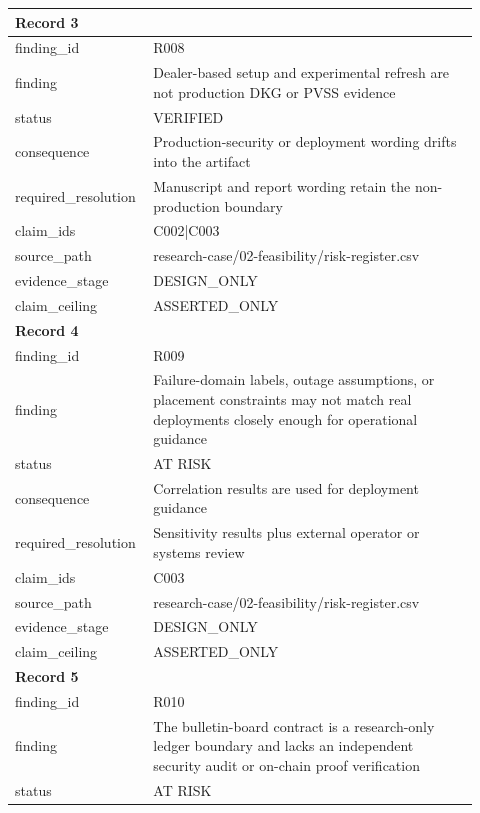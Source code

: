 \begin{longtable}{|p{0.24\linewidth}|p{0.68\linewidth}|}
\multicolumn{2}{|l|}{\textbf{Record 3}} \\ \hline
finding\_\allowbreak{}id & R008 \\ \hline
finding & Dealer-based setup and experimental refresh are not production DKG or PVSS evidence \\ \hline
status & VERIFIED \\ \hline
consequence & Production-security or deployment wording drifts into the artifact \\ \hline
required\_\allowbreak{}resolution & Manuscript and report wording retain the non-production boundary \\ \hline
claim\_\allowbreak{}ids & C002|C003 \\ \hline
source\_\allowbreak{}path & research-case/02-feasibility/risk-register.csv \\ \hline
evidence\_\allowbreak{}stage & DESIGN\_\allowbreak{}ONLY \\ \hline
claim\_\allowbreak{}ceiling & ASSERTED\_\allowbreak{}ONLY \\ \hline
\multicolumn{2}{|l|}{\textbf{Record 4}} \\ \hline
finding\_\allowbreak{}id & R009 \\ \hline
finding & Failure-domain labels, outage assumptions, or placement constraints may not match real deployments closely enough for operational guidance \\ \hline
status & AT RISK \\ \hline
consequence & Correlation results are used for deployment guidance \\ \hline
required\_\allowbreak{}resolution & Sensitivity results plus external operator or systems review \\ \hline
claim\_\allowbreak{}ids & C003 \\ \hline
source\_\allowbreak{}path & research-case/02-feasibility/risk-register.csv \\ \hline
evidence\_\allowbreak{}stage & DESIGN\_\allowbreak{}ONLY \\ \hline
claim\_\allowbreak{}ceiling & ASSERTED\_\allowbreak{}ONLY \\ \hline
\multicolumn{2}{|l|}{\textbf{Record 5}} \\ \hline
finding\_\allowbreak{}id & R010 \\ \hline
finding & The bulletin-board contract is a research-only ledger boundary and lacks an independent security audit or on-chain proof verification \\ \hline
status & AT RISK \\ \hline

\end{longtable}
